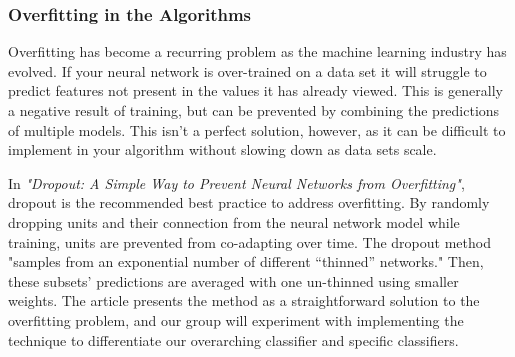 \documentclass[draftclsnofoot, onecolumn, 10pt, compsoc]{IEEEtran}
\begin{document}
        \subsubsection{Overfitting in the Algorithms}
        	Overfitting has become a recurring problem as the machine learning industry has evolved. If your neural network is over-trained on a data set it will struggle to predict features not present in the values it has already viewed. This is generally a negative result of training, but can be prevented by combining the predictions of multiple models. This isn't a perfect solution, however, as it can be difficult to implement in your algorithm without slowing down as data sets scale.  
            
In \textit{"Dropout: A Simple Way to Prevent Neural Networks from Overfitting"}, dropout is the recommended best practice to address overfitting. By randomly dropping units and their connection from the neural network model while training, units are prevented from co-adapting over time. The dropout method "samples from an exponential number of different “thinned” networks." Then, these subsets' predictions are averaged with one un-thinned using smaller weights. The article presents the method as a straightforward solution to the overfitting problem, and our group will experiment with implementing the technique to differentiate our overarching classifier and specific classifiers. \cite{srivastava2014dropout}
\newpage



\end{document}
